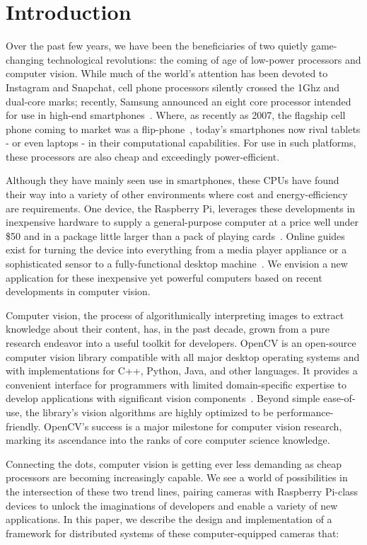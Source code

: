 \section{Introduction}
\label{sec:intro}

Over the past few years, we have been the beneficiaries of
two quietly game-changing technological revolutions: the coming
of age of low-power processors and computer vision.  While
much of the world's attention has been devoted to Instagram
and Snapchat, cell phone processors silently crossed the 1Ghz
and dual-core marks; recently, Samsung announced an eight core
processor intended for use in high-end smartphones~\cite{exynos}.
Where, as recently as 2007, the flagship cell phone coming to market
was a flip-phone~\cite{razr}, today's smartphones now rival tablets - 
or even laptops - in their computational capabilities.  For use in such
platforms, these processors are also cheap and exceedingly power-efficient.

Although they have mainly seen use in smartphones, these CPUs have
found their way into a variety of other environments where cost and
energy-efficiency are requirements.  One device, the Raspberry Pi,
leverages these developments in inexpensive hardware to supply a
general-purpose computer at a price well under \$50 and in a package
little larger than a pack of playing cards~\cite{pi:faqs}. Online guides exist
for turning the device into everything from a media player appliance
or a sophisticated sensor to a fully-functional desktop machine~\cite{pi:ideas}.
We envision a new application for these inexpensive yet powerful computers
based on recent developments in computer vision.

Computer vision, the process of algorithmically interpreting images to
extract knowledge about their content, has, in the past decade, grown
from a pure research endeavor into a useful toolkit for developers.
OpenCV is an open-source computer vision library compatible with all major
desktop operating systems and with implementations for C++, Python,
Java, and other languages.  It provides a convenient interface for
programmers with limited domain-specific expertise to develop applications
with significant vision components~\cite{cv:about}. Beyond simple ease-of-use,
the library's vision algorithms are highly optimized to be performance-friendly.
OpenCV's success is a major milestone for computer vision research, marking
its ascendance into the ranks of core computer science knowledge.

Connecting the dots, computer vision is getting ever less demanding as
cheap processors are becoming increasingly capable.  We see a world
of possibilities in the intersection of these two trend lines, pairing cameras
with Raspberry Pi-class devices to unlock the imaginations of developers
and enable a variety of new applications.  In this paper, we describe the
design and implementation of a framework for distributed systems of these
computer-equipped cameras that:

